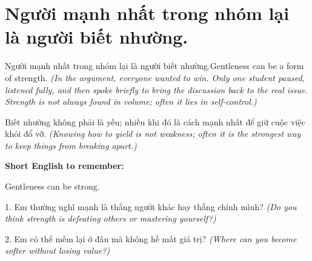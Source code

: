 \section{Người mạnh nhất trong nhóm lại là người biết nhường.}
\begin{truyen}{Người mạnh nhất trong nhóm lại là người biết nhường.}{Gentleness can be a form of strength.}
\textit{(In the argument, everyone wanted to win. Only one student paused, listened fully, and then spoke briefly to bring the discussion back to the real issue. Strength is not always found in volume; often it lies in self-control.)}
\end{truyen}
\begin{baihoc}
Biết nhường không phải là yếu; nhiều khi đó là cách mạnh nhất để giữ cuộc việc khỏi đổ vỡ.
\textit{(Knowing how to yield is not weakness; often it is the strongest way to keep things from breaking apart.)}
\end{baihoc}
\begin{ghinhoanh}
\textbf{Short English to remember:}

Gentleness can be strong.
\end{ghinhoanh}
\begin{tuhocnhanh}
1. Em thường nghĩ mạnh là thắng người khác hay thắng chính mình? \textit{(Do you think strength is defeating others or mastering yourself?)}

2. Em có thể mềm lại ở đâu mà không hề mất giá trị? \textit{(Where can you become softer without losing value?)}
\end{tuhocnhanh}
\ngancach

